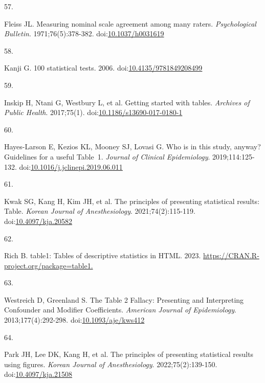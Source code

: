 \documentclass[
]{book}
\newlength{\cslhangindent}
\newlength{\csllabelwidth}
\newlength{\cslentryspacingunit} %
\newenvironment{CSLReferences}[2] %
 {%
  \setlength{\parindent}{0pt}
  \ifodd #1
  \let\oldpar\par
  \def\par{\hangindent=\cslhangindent\oldpar}
  \fi
  \setlength{\parskip}{#2\cslentryspacingunit}
 }%
 {}
\newcommand{\CSLLeftMargin}[1]{\parbox[t]{\csllabelwidth}{#1}}
\newcommand{\CSLRightInline}[1]{\parbox[t]{\linewidth - \csllabelwidth}{#1}\break}
\begin{document}
\begin{CSLReferences}{0}{0}
\leavevmode{}%
\CSLLeftMargin{57. }%
\CSLRightInline{Fleiss JL. Measuring nominal scale agreement among many raters. \emph{Psychological Bulletin}. 1971;76(5):378-382. doi:\href{https://doi.org/10.1037/h0031619}{10.1037/h0031619}}

\leavevmode{}%
\CSLLeftMargin{58. }%
\CSLRightInline{Kanji G. 100 statistical tests. 2006. doi:\href{https://doi.org/10.4135/9781849208499}{10.4135/9781849208499}}

\leavevmode{}%
\CSLLeftMargin{59. }%
\CSLRightInline{Inskip H, Ntani G, Westbury L, et al. Getting started with tables. \emph{Archives of Public Health}. 2017;75(1). doi:\href{https://doi.org/10.1186/s13690-017-0180-1}{10.1186/s13690-017-0180-1}}

\leavevmode{}%
\CSLLeftMargin{60. }%
\CSLRightInline{Hayes-Larson E, Kezios KL, Mooney SJ, Lovasi G. Who is in this study, anyway? Guidelines for a useful Table~1. \emph{Journal of Clinical Epidemiology}. 2019;114:125-132. doi:\href{https://doi.org/10.1016/j.jclinepi.2019.06.011}{10.1016/j.jclinepi.2019.06.011}}

\leavevmode{}%
\CSLLeftMargin{61. }%
\CSLRightInline{Kwak SG, Kang H, Kim JH, et al. The principles of presenting statistical results: Table. \emph{Korean Journal of Anesthesiology}. 2021;74(2):115-119. doi:\href{https://doi.org/10.4097/kja.20582}{10.4097/kja.20582}}

\leavevmode{}%
\CSLLeftMargin{62. }%
\CSLRightInline{Rich B. table1: Tables of descriptive statistics in HTML. 2023. \href{https://CRAN.R-project.org/package=table1}{https://CRAN.R-project.org/package=table1.}}

\leavevmode{}%
\CSLLeftMargin{63. }%
\CSLRightInline{Westreich D, Greenland S. The Table 2 Fallacy: Presenting and Interpreting Confounder and Modifier Coefficients. \emph{American Journal of Epidemiology}. 2013;177(4):292-298. doi:\href{https://doi.org/10.1093/aje/kws412}{10.1093/aje/kws412}}

\leavevmode{}%
\CSLLeftMargin{64. }%
\CSLRightInline{Park JH, Lee DK, Kang H, et al. The principles of presenting statistical results using figures. \emph{Korean Journal of Anesthesiology}. 2022;75(2):139-150. doi:\href{https://doi.org/10.4097/kja.21508}{10.4097/kja.21508}}


\end{CSLReferences}
\end{document}

